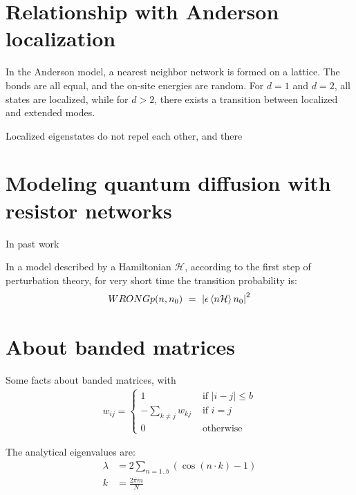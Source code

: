 \section{Relationship with Anderson localization}

In the Anderson model\cite{anderson_absense_1985}, a nearest neighbor network is formed
on a lattice. The bonds are all equal, and the on-site energies are random.
For $d=1$ and $d=2$, all states are localized, while for $d>2$, there exists
a transition between localized and extended modes. 

Localized eigenstates do not repel each other, and there

\section{Modeling quantum diffusion with resistor networks}

In past work \cite{PRL_2000} 

In a model described by a Hamiltonian $\mathcal{H}$,
according to the first step of perturbation theory,
for very short time the transition probability is:
%
\begin{align}
WRONG p(n, n_0)\ =\ \left| \epsilon \left\langle{n} \mathcal{H}\right\rangle{n_0}\right|^2
\end{align}
%


\section{About banded matrices}

Some facts about banded matrices, with 
\begin{align}
  w_{ij} = 
  \begin{cases}
    1 \quad &\textrm{  if  } |i-j|\le b   \\
    -\sum_{k \ne j} w_{kj} &\textrm{  if  } i = j  \\
    0 \quad &\textrm{  otherwise }
  \end{cases}
\end{align}

The analytical eigenvalues are:
\begin{align}
  \lambda &= 2\sum_{n=1..b} (\cos(n\cdot k) -1) \\
  k &= \frac{2\pi m}{N}
\end{align}


